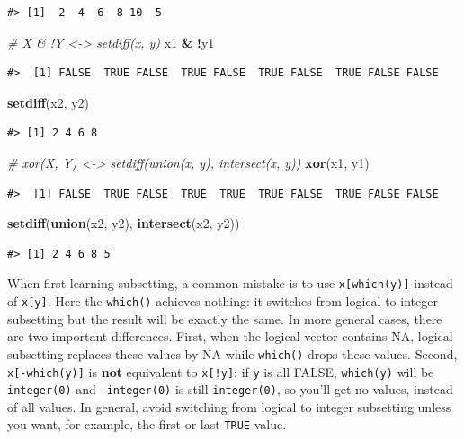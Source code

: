 \documentclass[]{book}
\newenvironment{Shaded}{\begin{snugshade}}{\end{snugshade}}
\newcommand{\KeywordTok}[1]{\textcolor[rgb]{0.13,0.29,0.53}{\textbf{#1}}}
\newcommand{\StringTok}[1]{\textcolor[rgb]{0.31,0.60,0.02}{#1}}
\newcommand{\CommentTok}[1]{\textcolor[rgb]{0.56,0.35,0.01}{\textit{#1}}}
\newcommand{\OperatorTok}[1]{\textcolor[rgb]{0.81,0.36,0.00}{\textbf{#1}}}
\newcommand{\NormalTok}[1]{#1}
\theoremstyle{definition}
\theoremstyle{definition}
\theoremstyle{definition}
\theoremstyle{remark}
\begin{document}
\begin{verbatim}
#> [1]  2  4  6  8 10  5
\end{verbatim}

\begin{Shaded}
\begin{Highlighting}[]
\CommentTok{# X & !Y <-> setdiff(x, y)}
\NormalTok{x1 }\OperatorTok{&}\StringTok{ }\OperatorTok{!}\NormalTok{y1}
\end{Highlighting}
\end{Shaded}

\begin{verbatim}
#>  [1] FALSE  TRUE FALSE  TRUE FALSE  TRUE FALSE  TRUE FALSE FALSE
\end{verbatim}

\begin{Shaded}
\begin{Highlighting}[]
\KeywordTok{setdiff}\NormalTok{(x2, y2)}
\end{Highlighting}
\end{Shaded}

\begin{verbatim}
#> [1] 2 4 6 8
\end{verbatim}

\begin{Shaded}
\begin{Highlighting}[]
\CommentTok{# xor(X, Y) <-> setdiff(union(x, y), intersect(x, y))}
\KeywordTok{xor}\NormalTok{(x1, y1)}
\end{Highlighting}
\end{Shaded}

\begin{verbatim}
#>  [1] FALSE  TRUE FALSE  TRUE  TRUE  TRUE FALSE  TRUE FALSE FALSE
\end{verbatim}

\begin{Shaded}
\begin{Highlighting}[]
\KeywordTok{setdiff}\NormalTok{(}\KeywordTok{union}\NormalTok{(x2, y2), }\KeywordTok{intersect}\NormalTok{(x2, y2))}
\end{Highlighting}
\end{Shaded}

\begin{verbatim}
#> [1] 2 4 6 8 5
\end{verbatim}

When first learning subsetting, a common mistake is to use
\texttt{x{[}which(y){]}} instead of \texttt{x{[}y{]}}. Here the
\texttt{which()} achieves nothing: it switches from logical to integer
subsetting but the result will be exactly the same. In more general
cases, there are two important differences. First, when the logical
vector contains NA, logical subsetting replaces these values by NA while
\texttt{which()} drops these values. Second, \texttt{x{[}-which(y){]}}
is \textbf{not} equivalent to \texttt{x{[}!y{]}}: if \texttt{y} is all
FALSE, \texttt{which(y)} will be \texttt{integer(0)} and
\texttt{-integer(0)} is still \texttt{integer(0)}, so you'll get no
values, instead of all values. In general, avoid switching from logical
to integer subsetting unless you want, for example, the first or last
\texttt{TRUE} value.
\end{document}
